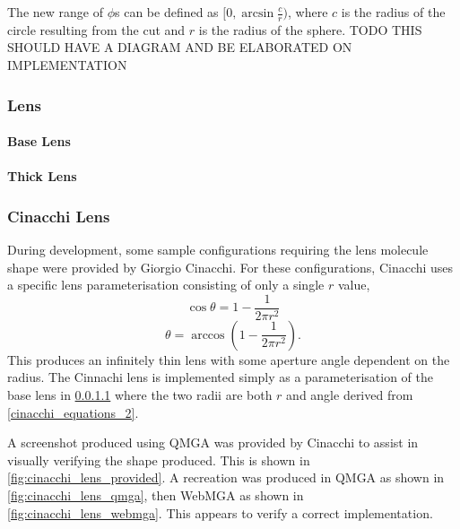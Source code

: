 The new range of $\phi$s can be defined as $[0, \arcsin\frac{c}{r})$, where $c$ is the radius of the circle resulting from the cut and $r$ is the radius of the sphere. TODO THIS SHOULD HAVE A DIAGRAM AND BE ELABORATED ON IMPLEMENTATION

\subsubsection{Lens}
\paragraph{Base Lens}
\label{base_lens_para}
\paragraph{Thick Lens}

\subsubsection{Cinacchi Lens}
During development, some sample configurations requiring the lens molecule shape were provided by Giorgio Cinacchi. For these configurations, Cinacchi uses a specific lens parameterisation consisting of only a single $r$ value,
\begin{equation}
\cos\theta=1-\frac{1}{2\pi r^2}
\label{cinacchi_equations_1}
\end{equation}
\begin{equation}
\theta=\arccos\left(1-\frac{1}{2\pi r^2}\right).
\label{cinacchi_equations_2}
\end{equation}
This produces an infinitely thin lens with some aperture angle dependent on the radius. The Cinnachi lens is implemented simply as a parameterisation of the base lens in \cref{base_lens_para} where the two radii are both $r$ and angle derived from \cref{cinacchi_equations_2}.

A screenshot produced using QMGA was provided by Cinacchi to assist in visually verifying the shape produced. This is shown in \cref{fig:cinacchi_lens_provided}. A recreation was produced in QMGA as shown in \cref{fig:cinacchi_lens_qmga}, then WebMGA as shown in \cref{fig:cinacchi_lens_webmga}. This appears to verify a correct implementation.

